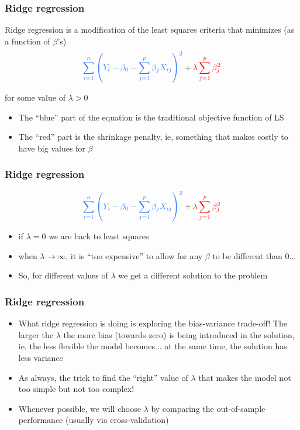 \documentclass{beamer}
\newcommand{\sko}{\vspace{.1in}}
\newcommand{\skoo}{\vspace{.2in}}
\begin{document}
\begin{frame}
\frametitle{Ridge regression}
{\color{lightblue} Ridge regression} is a modification of the least squares criteria that minimizes (as a function of $\beta$'s)\sko
$$
{\color{lightblue}\sum_{i=1}^n \left( Y_i - \beta_0 -  \sum_{j=1}^p \beta_j X_{ij} \right)^2 }+ {\color{red}\lambda\sum_{j=1}^p \beta_j^2}  
$$

\sko
for some value of $\lambda >0$ 

\skoo

\begin{itemize}
\item The {\color{lightblue}``blue''} part of the equation is the traditional objective function of LS
\item The {\color{red}``red''} part is the shrinkage penalty, ie, something that makes costly to have big values for $\beta$
\end{itemize}
\end{frame}


\begin{frame}
\frametitle{Ridge regression}
$$
{\color{lightblue}\sum_{i=1}^n \left( Y_i - \beta_0 -  \sum_{j=1}^p \beta_j X_{ij} \right)^2 }+ {\color{red}\lambda\sum_{j=1}^p \beta_j^2}  
$$\sko

\begin{itemize}
\item if $\lambda = 0$ we are back to least squares
\item when $\lambda \rightarrow \infty$, it is {\color{red}``too expensive''} to allow for any $\beta$ to be different than 0... 
\item So, for different values of $\lambda$ we get a different solution to the problem
\end{itemize}
\end{frame}


\begin{frame}
\frametitle{Ridge regression}
\begin{itemize}
\item What ridge regression is doing is exploring the {\color{lightblue}bias-variance trade-off!} The larger the $\lambda$ the more bias (towards zero) is being introduced in the solution, ie, the less flexible the model becomes... at the same time, the solution has less {\color{red}variance}
\item  As always, the trick to find the ``right'' value of $\lambda$ that makes the model {\color{lightblue}not too simple but not too complex!} 
\item Whenever possible, we will choose $\lambda$ by comparing the out-of-sample performance (usually via cross-validation)
\end{itemize}

\end{frame}
\end{document}
